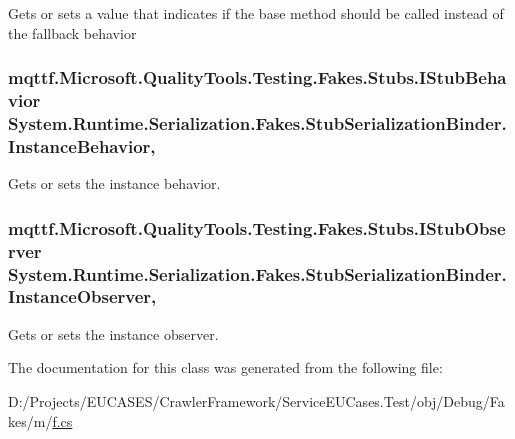 Gets or sets a value that indicates if the base method should be called instead of the fallback behavior

\hypertarget{class_system_1_1_runtime_1_1_serialization_1_1_fakes_1_1_stub_serialization_binder_adfad2153da5061272085e26a0e48c05f}{
\subsubsection[{Instance\-Behavior}]{\setlength{\rightskip}{0pt plus 5cm}mqttf.\-Microsoft.\-Quality\-Tools.\-Testing.\-Fakes.\-Stubs.\-I\-Stub\-Behavior System.\-Runtime.\-Serialization.\-Fakes.\-Stub\-Serialization\-Binder.\-Instance\-Behavior\hspace{0.3cm}{\ttfamily [get]}, {\ttfamily [set]}}}\label{class_system_1_1_runtime_1_1_serialization_1_1_fakes_1_1_stub_serialization_binder_adfad2153da5061272085e26a0e48c05f}


Gets or sets the instance behavior.

\hypertarget{class_system_1_1_runtime_1_1_serialization_1_1_fakes_1_1_stub_serialization_binder_a51f192ab2880c5bd086e9cf92ec4a695}{
\subsubsection[{Instance\-Observer}]{\setlength{\rightskip}{0pt plus 5cm}mqttf.\-Microsoft.\-Quality\-Tools.\-Testing.\-Fakes.\-Stubs.\-I\-Stub\-Observer System.\-Runtime.\-Serialization.\-Fakes.\-Stub\-Serialization\-Binder.\-Instance\-Observer\hspace{0.3cm}{\ttfamily [get]}, {\ttfamily [set]}}}\label{class_system_1_1_runtime_1_1_serialization_1_1_fakes_1_1_stub_serialization_binder_a51f192ab2880c5bd086e9cf92ec4a695}


Gets or sets the instance observer.



The documentation for this class was generated from the following file\-:\begin{DoxyCompactItemize}
\item 
D\-:/\-Projects/\-E\-U\-C\-A\-S\-E\-S/\-Crawler\-Framework/\-Service\-E\-U\-Cases.\-Test/obj/\-Debug/\-Fakes/m/\hyperlink{m_2f_8cs}{f.\-cs}\end{DoxyCompactItemize}
